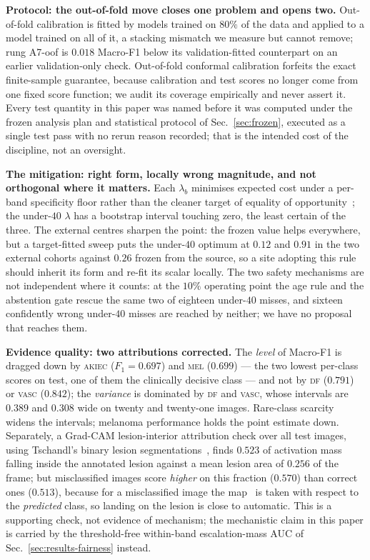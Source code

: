 \documentclass[journal]{IEEEtran}
\begin{document}
\textbf{Protocol: the out-of-fold move closes one problem and opens two.} Out-of-fold
calibration is fitted by models trained on $80\%$ of the data and applied to a model trained on
all of it, a stacking mismatch we measure but cannot remove; rung A7-oof is $0.018$ Macro-F1
below its validation-fitted counterpart on an earlier validation-only check. Out-of-fold
conformal calibration forfeits the exact finite-sample guarantee, because calibration and test
scores no longer come from one fixed score function; we audit its coverage empirically and
never assert it. Every test quantity in this paper was named before it was computed under the
frozen analysis plan and statistical protocol of Sec.~\ref{sec:frozen}, executed as a single
test pass with no rerun reason recorded; that is the intended cost of the discipline, not an
oversight.

\textbf{The mitigation: right form, locally wrong magnitude, and not orthogonal where it
matters.} Each $\lambda_b$ minimises expected cost under a per-band specificity floor rather
than the cleaner target of equality of opportunity~\cite{hardt2016equality}; the under-$40$
$\lambda$ has a bootstrap interval touching zero, the least certain of the three. The external
centres sharpen the point: the frozen value helps everywhere, but a target-fitted sweep puts the
under-$40$ optimum at $0.12$ and $0.91$ in the two external cohorts against $0.26$ frozen from
the source, so a site adopting this rule should inherit its form and re-fit its scalar locally.
The two safety mechanisms are not independent where it counts: at the $10\%$ operating point
the age rule and the abstention gate rescue the same two of eighteen under-$40$ misses, and
sixteen confidently wrong under-$40$ misses are reached by neither; we have no proposal that
reaches them.

\textbf{Evidence quality: two attributions corrected.} The \emph{level} of Macro-F1 is dragged
down by \textsc{akiec} ($F_1=0.697$) and \textsc{mel} ($0.699$) --- the two lowest per-class
scores on test, one of them the clinically decisive class --- and not by \textsc{df} ($0.791$)
or \textsc{vasc} ($0.842$); the \emph{variance} is dominated by \textsc{df} and \textsc{vasc},
whose intervals are $0.389$ and $0.308$ wide on twenty and twenty-one images. Rare-class
scarcity widens the intervals; melanoma performance holds the point estimate down. Separately,
a Grad-CAM lesion-interior attribution check over all test images, using Tschandl's binary
lesion segmentations~\cite{tschandl2020segmentations}, finds $0.523$ of activation mass falling
inside the annotated lesion against a mean lesion area of $0.256$ of the frame; but
misclassified images score \emph{higher} on this fraction ($0.570$) than correct ones
($0.513$), because for a misclassified image the map~\cite{selvaraju2017gradcam} is taken with
respect to the \emph{predicted} class, so landing on the lesion is close to automatic. This is
a supporting check, not evidence of mechanism; the mechanistic claim in this paper is carried
by the threshold-free within-band escalation-mass AUC of Sec.~\ref{sec:results-fairness}
instead.
\end{document}
